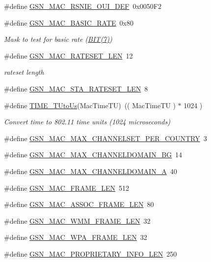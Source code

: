 \begin{DoxyCompactItemize}
\item 
\#define \hyperlink{a00522_aee7bb76b19849f47fa6440e5faf9b64f}{GSN\_\-MAC\_\-RSNIE\_\-OUI\_\-DEF}~0x0050F2
\item 
\#define \hyperlink{a00642_ga5dd3f6052d990b4ee0d404f05787ce20}{GSN\_\-MAC\_\-BASIC\_\-RATE}~0x80
\begin{DoxyCompactList}\small\item\em Mask to test for basic rate (\hyperlink{a00481_a3a8ea58898cb58fc96013383d39f482c}{BIT(7)}) \end{DoxyCompactList}\item 
\#define \hyperlink{a00642_ga3c207cac645e3d78288b23f6291d759e}{GSN\_\-MAC\_\-RATESET\_\-LEN}~12
\begin{DoxyCompactList}\small\item\em rateset length \end{DoxyCompactList}\item 
\#define \hyperlink{a00522_a2aafb0a022ad0aa4856df5c4fa840e0e}{GSN\_\-MAC\_\-STA\_\-RATESET\_\-LEN}~8
\item 
\#define \hyperlink{a00642_gabec601feeb30bf739dc67873ac12c4ba}{TIME\_\-TUtoUs}(MacTimeTU)~(( MacTimeTU ) $\ast$ 1024 )
\begin{DoxyCompactList}\small\item\em Convert time to 802.11 time units (1024 microseconds) \end{DoxyCompactList}\item 
\#define \hyperlink{a00522_a29265c71de05016a9a4cb2e5f57e450d}{GSN\_\-MAC\_\-MAX\_\-CHANNELSET\_\-PER\_\-COUNTRY}~3
\item 
\#define \hyperlink{a00522_a69dd34609ffc0b471bbd3eaa1586ad4b}{GSN\_\-MAC\_\-MAX\_\-CHANNELDOMAIN\_\-BG}~14
\item 
\#define \hyperlink{a00522_a0190b853ff7163a58d61d96c57abff6c}{GSN\_\-MAC\_\-MAX\_\-CHANNELDOMAIN\_\-A}~40
\item 
\#define \hyperlink{a00522_a71317c8ae3896c4b366852492dd940c7}{GSN\_\-MAC\_\-FRAME\_\-LEN}~512
\item 
\#define \hyperlink{a00522_a75298d7c1a91acf7fa7f2d182d22dc1f}{GSN\_\-MAC\_\-ASSOC\_\-FRAME\_\-LEN}~80
\item 
\#define \hyperlink{a00522_ac8d840ed23118a967d20cbc5fd51dccc}{GSN\_\-MAC\_\-WMM\_\-FRAME\_\-LEN}~32
\item 
\#define \hyperlink{a00522_ad94df2f86ca411651520f3bc762b1e0b}{GSN\_\-MAC\_\-WPA\_\-FRAME\_\-LEN}~32
\item 
\#define \hyperlink{a00522_acba15cc1684a86348849924ed0c4d0b1}{GSN\_\-MAC\_\-PROPRIETARY\_\-INFO\_\-LEN}~250
\end{DoxyCompactItemize}
